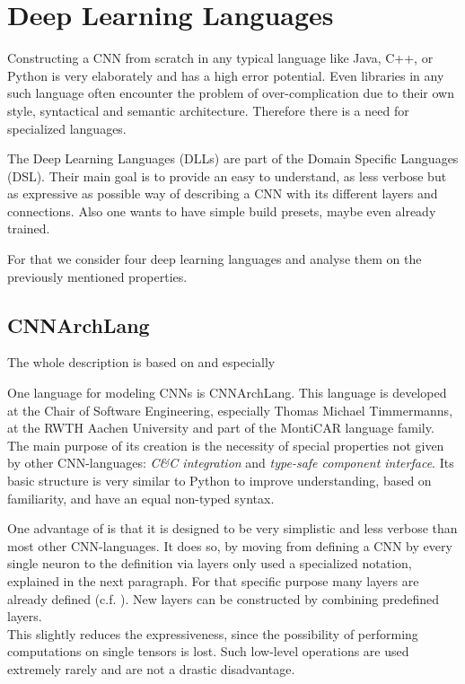 \chapter{Deep Learning Languages}\label{chapter: DLL}

Constructing a CNN from scratch in any typical language like Java, C++, or Python is very elaborately and has a high error potential. Even libraries in any such language often encounter the problem of over-complication due to their own style, syntactical and semantic architecture. Therefore there is a need for specialized languages.

The Deep Learning Languages (DLLs) are part of the Domain Specific Languages (DSL). Their main goal is to provide an easy to understand, as less verbose but as expressive as possible way of describing a CNN with its different layers and connections. Also one wants to have simple build presets, maybe even already trained.

For that we consider four deep learning languages and analyse them on the previously mentioned properties.

\section{CNNArchLang}\label{sec: CNNArch}

The whole description is based on\cite{CNNArch} and especially \cite{tim2018CNNArchLang}

One language for modeling CNNs is CNNArchLang. This language is developed at the Chair of Software Engineering, especially Thomas Michael Timmermanns,  at the RWTH Aachen University and part of the MontiCAR language family. The main purpose of its creation is the necessity of special properties not given by other CNN-languages: \textit{C\&C integration} and \textit{type-safe component interface}. Its basic structure is very similar to Python to improve understanding, based on familiarity, and have an equal non-typed syntax. 

One advantage of \cnnarch is that it is designed to be very simplistic and less verbose than most other CNN-languages. It does so, by moving from defining a CNN by every single neuron to the definition via layers only used a specialized notation, explained in the next paragraph. For that specific purpose many layers are already defined (c.f. ). 
New layers can be constructed by combining predefined layers.\\
This slightly reduces the expressiveness, since the possibility of performing computations on single tensors is lost. Such low-level operations are used extremely rarely and are not a drastic disadvantage.

